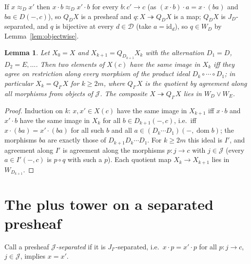 \documentclass[11pt]{amsart}
\newtheorem{lem}[thm]{Lemma}
\theoremstyle{definition}
\newcommand{\sD}{\mathcal D}
\newcommand{\sJ}{\mathcal J}
\begin{document}
If $x\approx_Dx'$ then $x\cdot b\approx_Dx'\cdot b$ for every $b\colon c'\to c$
(as $(x\cdot b)\cdot a=x\cdot(ba)$ and $ba\in D(-,c)$), so $Q_DX$ is a presheaf
and $q\colon X\twoheadrightarrow Q_DX$ is a map; $Q_DX$ is $J_D$-separated, and
$q$ is bijective at every $d\in\sD$ (take $a=\mathrm{id}_d$), so $q\in W_D$ by
Lemma~\ref{lem:objectwise}.

\begin{lem}\label{lem:quotient}
Let $X_0=X$ and $X_{k+1}=Q_{D_{k+1}}X_k$ with the alternation $D_1=D$, $D_2=E,\dots$.
Then two elements of $X(c)$ have the same image in $X_k$ iff they agree on
restriction along every morphism of the product ideal $D_k\circ\cdots\circ D_1$;
in particular $X_k=Q_{I'}X$ for $k\ge2m$, where $Q_{I'}X$ is the quotient by
agreement along all morphisms from objects of $\sJ$. The composite
$X\twoheadrightarrow Q_{I'}X$ lies in $W_D\vee W_E$.
\end{lem}
\begin{proof}
Induction on $k$: $x,x'\in X(c)$ have the same image in $X_{k+1}$ iff
$x\cdot b$ and $x'\cdot b$ have the same image in $X_k$ for all
$b\in D_{k+1}(-,c)$, i.e.\ iff $x\cdot(ba)=x'\cdot(ba)$ for all such $b$ and
all $a\in(D_k\cdots D_1)(-,\operatorname{dom}b)$; the morphisms $ba$ are
exactly those of $D_{k+1}D_k\cdots D_1$. For $k\ge2m$ this ideal is $I'$, and
agreement along $I'$ is agreement along the morphisms $p\colon j\to c$ with
$j\in\sJ$ (every $a\in I'(-,c)$ is $p\circ q$ with such a $p$). Each quotient
map $X_k\to X_{k+1}$ lies in $W_{D_{k+1}}$.
\end{proof}

\section{The plus tower on a separated presheaf}\label{sec:plus}

Call a presheaf \emph{$\sJ$-separated} if it is $J_{I'}$-separated, i.e.\
$x\cdot p=x'\cdot p$ for all $p\colon j\to c$, $j\in\sJ$, implies $x=x'$.
\end{document}
